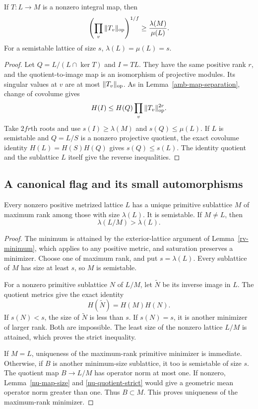 \begin{lemma}\label{nu-map-size}
If $T:L\to M$ is a nonzero integral map, then
\begin{equation}\label{nu-map-size-inequality}
 \left(\prod_v\|T_v\|_{\rm op}\right)^{1/f}
                              \ge\frac{\lambda(M)}{\mu(L)}.
\end{equation}
For a semistable lattice of size $s$,
$\lambda(L)=\mu(L)=s$.
\end{lemma}
\begin{proof}
Let $Q=L/(L\cap\ker T)$ and $I=TL$.  They have the
same positive rank $r$, and the quotient-to-image
map is an isomorphism of projective modules.
Its singular values at $v$ are at most
$\|T_v\|_{\rm op}$.  As in
Lemma~\ref{amb-map-separation}, change of covolume gives
\[
 H(I)\le H(Q)\prod_v\|T_v\|_{\rm op}^{2r}.
\]
Take $2fr$th roots and use
$s(I)\ge\lambda(M)$ and $s(Q)\le\mu(L)$.
If $L$ is semistable and $Q=L/S$ is a nonzero
projective quotient, the exact covolume identity
$H(L)=H(S)H(Q)$ gives $s(Q)\le s(L)$.
The identity quotient and the sublattice $L$ itself
give the reverse inequalities.
\end{proof}

\subsection{A canonical flag and its small automorphisms}

\begin{lemma}\label{nu-largest-minimum}
Every nonzero positive metrized lattice $L$ has a
unique primitive sublattice $M$ of maximum rank
among those with size $\lambda(L)$.  It is
semistable.  If $M\ne L$, then
\begin{equation}\label{nu-quotient-strict}
                        \lambda(L/M)>\lambda(L).
\end{equation}
\end{lemma}
\begin{proof}
The minimum is attained by the exterior-lattice
argument of Lemma~\ref{rv-minimum}, which applies to
any positive metric, and saturation preserves a
minimizer.  Choose one of maximum rank, and put
$s=\lambda(L)$.  Every sublattice of $M$ has size
at least $s$, so $M$ is semistable.

For a nonzero primitive sublattice $N$ of $L/M$,
let $\widetilde N$ be its inverse image in $L$.
The quotient metrics give the exact identity
\[
 H(\widetilde N)=H(M)H(N).
\]
If $s(N)<s$, the size of $\widetilde N$ is less than
$s$.  If $s(N)=s$, it is another minimizer of
larger rank.  Both are impossible.  The least
size of the nonzero lattice $L/M$ is attained,
which proves the strict inequality.

If $M=L$, uniqueness of the maximum-rank
primitive minimizer is immediate.  Otherwise,
if $B$ is another minimum-size sublattice, it too
is semistable of size $s$.  The quotient map
$B\to L/M$ has operator norm at most one.
If nonzero, Lemma~\ref{nu-map-size} and
\eqref{nu-quotient-strict} would give a geometric
mean operator norm greater than one.
Thus $B\subset M$.  This proves uniqueness of
the maximum-rank minimizer.
\end{proof}

